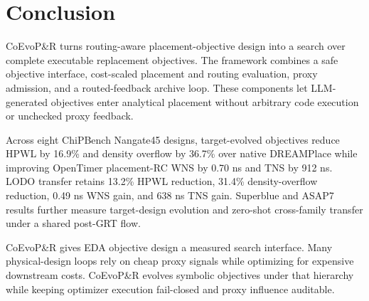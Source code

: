 \section{Conclusion}

CoEvoP\&R turns routing-aware placement-objective design into a search over
complete executable replacement objectives. The framework combines a safe
objective interface, cost-scaled placement and routing evaluation, proxy
admission, and a routed-feedback archive loop.
These components let
LLM-generated objectives enter analytical placement without arbitrary code
execution or unchecked proxy feedback.

Across eight ChiPBench Nangate45 designs, target-evolved objectives reduce
HPWL by 16.9\% and density overflow by 36.7\% over native DREAMPlace while
improving OpenTimer placement-RC WNS by 0.70 ns and TNS by 912 ns. LODO
transfer retains 13.2\% HPWL reduction, 31.4\% density-overflow reduction,
0.49 ns WNS gain, and 638 ns TNS gain. Superblue and ASAP7 results further
measure target-design evolution and zero-shot cross-family transfer under a
shared post-GRT flow.

CoEvoP\&R gives EDA objective design a measured search interface. Many
physical-design loops rely on cheap proxy signals while optimizing for
expensive downstream costs. CoEvoP\&R evolves symbolic objectives under that
hierarchy while keeping optimizer execution fail-closed and proxy influence
auditable.

